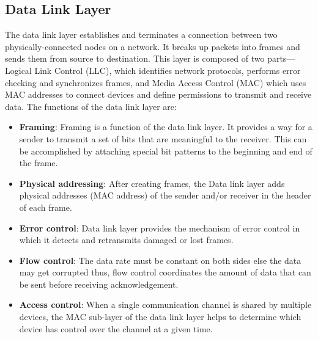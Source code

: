 \documentclass{article}
\begin{document}
    \subsection{Data Link Layer}
    The data link layer establishes and terminates a connection between two physically-connected nodes on a network. It breaks up packets into frames and sends them from source to destination. This layer is composed of two parts—Logical Link Control (LLC), which identifies network protocols, performs error checking and synchronizes frames, and Media Access Control (MAC) which uses MAC addresses to connect devices and define permissions to transmit and receive data.
    The functions of the data link layer are:
    \begin{itemize}
        \item \textbf{Framing}: Framing is a function of the data link layer. It provides a way for a sender to transmit a set of bits that are meaningful to the receiver. This can be accomplished by attaching special bit patterns to the beginning and end of the frame.
        \item \textbf{Physical addressing}: After creating frames, the Data link layer adds physical addresses (MAC address) of the sender and/or receiver in the header of each frame.
        \item \textbf{Error control}: Data link layer provides the mechanism of error control in which it detects and retransmits damaged or lost frames.
        \item \textbf{Flow control}: The data rate must be constant on both sides else the data may get corrupted thus, flow control coordinates the amount of data that can be sent before receiving acknowledgement.
        \item \textbf{Access control}: When a single communication channel is shared by multiple devices, the MAC sub-layer of the data link layer helps to determine which device has control over the channel at a given time.
    \end{itemize}
\end{document}
